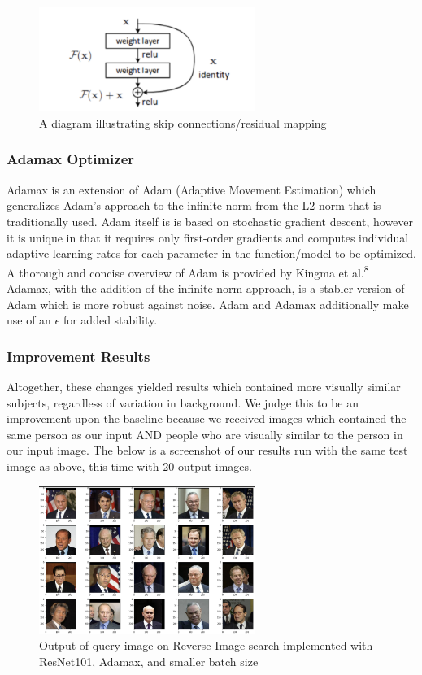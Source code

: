 \documentclass[conference]{IEEEtran}
\begin{document}
\begin{figure} [h]
    \centering
    \includegraphics[width=7cm]{skip ex.png}
    \caption{A diagram illustrating skip connections/residual mapping}
    \label{fig:6}
\end{figure}


\subsubsection{Adamax Optimizer}

Adamax is an extension of Adam (Adaptive Movement Estimation) which generalizes Adam's approach to the infinite norm from the L2 norm that is traditionally used. Adam itself is is based on stochastic gradient descent, however it is unique in that it requires only first-order gradients and computes individual adaptive learning rates for each parameter in the function/model to be optimized. A thorough and concise overview of Adam is provided by Kingma et al.\textsuperscript{8} Adamax, with the addition of the infinite norm approach, is a stabler version of Adam which is more robust against noise. Adam and Adamax additionally make use of an $\epsilon$ for added stability.


\subsubsection{Improvement Results}
Altogether, these changes yielded results which contained more visually similar subjects, regardless of variation in background. We judge this to be an improvement upon the baseline because we received images which contained the same person as our input AND people who are visually similar to the person in our input image. The below is a screenshot of our results run with the same test image as above, this time with 20 output images.

\begin{figure}[h]
    \centering
    \includegraphics[width=7cm]{improvement.png}
    \caption{Output of query image on Reverse-Image search implemented with ResNet101, Adamax, and smaller batch size}
    \label{fig:7}
\end{figure}
\end{document}

